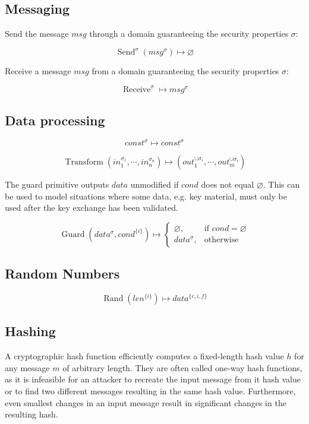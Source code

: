 \documentclass[a4paper]{article}
\DeclareMathOperator{\trans}{Transform}
\DeclareMathOperator{\rand}{Rand}
\DeclareMathOperator{\send}{Send}
\DeclareMathOperator{\recv}{Receive}
\DeclareMathOperator{\guard}{Guard}
\newcommand{\emptysec}{\varnothing}
\begin{document}
\subsection{Messaging}

Send the message $msg$ through a domain guaranteeing the security properties $\sigma$:

$$\send^\sigma(msg^\sigma) \mapsto \emptysec$$

Receive a message $msg$ from a domain guaranteeing the security properties $\sigma$:

$$\recv^\sigma \mapsto msg^\sigma$$

\subsection{Data processing}

$$const^{\sigma} \mapsto const^{\sigma}$$

$$\trans(in_1^{\sigma_1}, \cdots, in_n^{\sigma_n}) \mapsto (out_1^{\cup\sigma_i},\cdots,out_m^{\cup\sigma_i})$$

The guard primitive outputs $data$ unmodified if $cond$ does not equal
$\emptysec$. This can be used to model situations where some data, e.g. key
material, must only be used after the key exchange has been validated.

\begin{equation*}
\guard(data^{\sigma}, cond^{\{i\}}) \mapsto
    \begin{cases}
        \emptysec,      & \text{if $cond = \emptysec$} \\
        data^{\sigma},  & \text{otherwise}
    \end{cases}
\end{equation*}

\subsection{Random Numbers}

$$\rand(len^{\{i\}}) \mapsto data^{\{c,i,f\}}$$

\subsection{Hashing}

A cryptographic hash function efficiently computes a fixed-length hash value
$h$ for any message $m$ of arbitrary length. They are often called one-way hash
functions, as it is infeasible for an attacker to recreate the input message
from it hash value or to find two different messages resulting in the same hash
value. Furthermore, even smallest changes in an input message result in
significant changes in the resulting hash.
\end{document}
